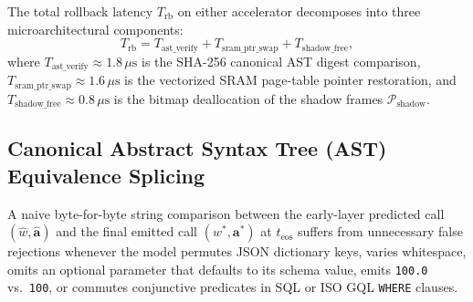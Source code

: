 \documentclass[10pt,conference]{IEEEtran}
\begin{document}
The total rollback latency $T_{\text{rb}}$ on either accelerator decomposes into three microarchitectural components:
\begin{equation}
T_{\text{rb}} = T_{\text{ast\_verify}} + T_{\text{sram\_ptr\_swap}} + T_{\text{shadow\_free}},
\label{eq:rollback_decomposition}
\end{equation}
where $T_{\text{ast\_verify}} \approx 1.8\,\mu\text{s}$ is the SHA-256 canonical AST digest comparison, $T_{\text{sram\_ptr\_swap}} \approx 1.6\,\mu\text{s}$ is the vectorized SRAM page-table pointer restoration, and $T_{\text{shadow\_free}} \approx 0.8\,\mu\text{s}$ is the bitmap deallocation of the shadow frames $\mathcal{P}_{\text{shadow}}$.

\subsection{Canonical Abstract Syntax Tree (AST) Equivalence Splicing}
A naive byte-for-byte string comparison between the early-layer predicted call $(\hat{w}, \hat{\mathbf{a}})$ and the final emitted call $(w^*, \mathbf{a}^*)$ at $t_{\text{eos}}$ suffers from unnecessary false rejections whenever the model permutes JSON dictionary keys, varies whitespace, omits an optional parameter that defaults to its schema value, emits \texttt{100.0} vs.\ \texttt{100}, or commutes conjunctive predicates in SQL or ISO GQL \texttt{WHERE} clauses.
\end{document}

